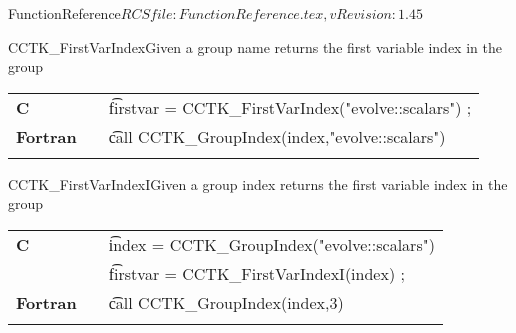 \begin{cactuspart}{5}{FunctionReference}{$RCSfile: FunctionReference.tex,v $}{$Revision: 1.45 $}
\begin{CCTKFunc}{CCTK\_FirstVarIndex}{Given a group name returns the first variable index in the group}
\begin{discussion}
\end{discussion}
\begin{examples}
\begin{tabular}{@{}p{3cm}cp{11cm}}
\hfill {\bf C} && {\t firstvar = CCTK\_FirstVarIndex("evolve::scalars") ;}
\\
\hfill {\bf Fortran} && {\t call CCTK\_GroupIndex(index,"evolve::scalars")}\\
\\
\end{tabular}
\end{examples}
\begin{errorcodes}
\end{errorcodes}
\end{CCTKFunc}


\begin{CCTKFunc}{CCTK\_FirstVarIndexI}{Given a group index returns the first variable index in the group}
\label{CCTK-FirstVarIndexI}
\showargs
\begin{params}
\end{params}
\begin{discussion}

\end{discussion}
\begin{examples}
\begin{tabular}{@{}p{3cm}cp{11cm}}
\hfill {\bf C} && {\t index = CCTK\_GroupIndex("evolve::scalars")}\\
               &&{\t firstvar = CCTK\_FirstVarIndexI(index) ;}
\\
\hfill {\bf Fortran} && {\t call CCTK\_GroupIndex(index,3)}\\
\\
\end{tabular}
\end{examples}
\begin{errorcodes}
\end{errorcodes}
\end{CCTKFunc}



\end{cactuspart}
